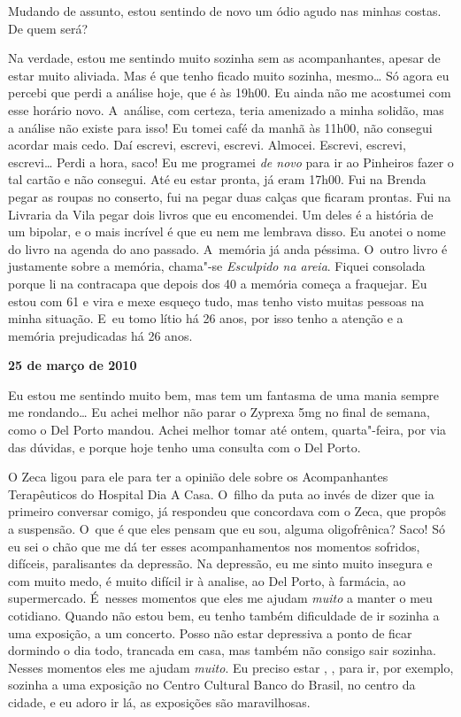 Mudando de assunto, estou sentindo de novo um ódio agudo nas minhas
costas. De quem será?

Na verdade, estou me sentindo muito sozinha sem as acompanhantes, apesar
de estar muito aliviada. Mas é que tenho ficado muito sozinha,
mesmo… Só agora eu percebi que perdi a análise hoje, que é às
19h00. Eu ainda não me acostumei com esse horário novo. A~análise, com
certeza, teria amenizado a minha solidão, mas a análise não existe para
isso! Eu tomei café da manhã às 11h00, não consegui acordar mais cedo.
Daí escrevi, escrevi, escrevi. Almocei. Escrevi, escrevi,
escrevi… Perdi a hora, saco! Eu me programei \emph{de novo} para
ir ao Pinheiros fazer o tal cartão e não consegui. Até eu estar pronta,
já eram 17h00. Fui na Brenda pegar as roupas no conserto, fui na 
pegar duas calças que ficaram prontas. Fui na Livraria da Vila pegar
dois livros que eu encomendei. Um deles é a história de um bipolar, e o
mais incrível é que eu nem me lembrava disso. Eu anotei o nome do livro na
agenda do ano passado. A~memória já anda péssima. O~outro livro é
justamente sobre a memória, chama"-se \emph{Esculpido na areia}. Fiquei
consolada porque li na contracapa que depois dos 40 a memória começa a
fraquejar. Eu estou com 61 e vira e mexe esqueço tudo, mas tenho visto
muitas pessoas na minha situação. E~eu tomo lítio há 26 anos, por
isso tenho a atenção e a memória prejudicadas há 26 anos.

\begin{center}\textbf{\asterisc{}}\end{center}


\begin{flushright}\textbf{25 de março de 2010}\end{flushright}


Eu estou me sentindo muito bem, mas tem um fantasma de uma mania
sempre me rondando… Eu achei melhor não parar o Zyprexa 5mg no
final de semana, como o Del Porto mandou. Achei melhor tomar até ontem,
quarta"-feira, por via das dúvidas, e porque hoje tenho uma consulta com
o Del Porto.

O Zeca ligou para ele para ter a opinião dele sobre os Acompanhantes
Terapêuticos do Hospital Dia A Casa. O~filho da puta ao invés de dizer
que ia primeiro conversar comigo, já respondeu que concordava com o
Zeca, que propôs a suspensão. O~que é que eles pensam que eu sou, alguma
oligofrênica? Saco! Só eu sei o chão que me dá ter esses
acompanhamentos nos momentos sofridos, difíceis, paralisantes da
depressão. Na depressão, eu me sinto muito insegura e com muito medo, é
muito difícil ir à analise, ao Del Porto, à farmácia, ao supermercado. É~nesses momentos que eles me ajudam \emph{muito} a manter o meu
cotidiano. Quando não estou bem, eu tenho também dificuldade de ir
sozinha a uma exposição, a um concerto. Posso não estar depressiva a
ponto de ficar dormindo o dia todo, trancada em casa, mas também não
consigo sair sozinha. Nesses momentos eles me ajudam \emph{muito}. Eu
preciso estar , ,  para ir, por exemplo, sozinha a uma
exposição no Centro Cultural Banco do Brasil, no centro da cidade, e eu
adoro ir lá, as exposições são maravilhosas.

